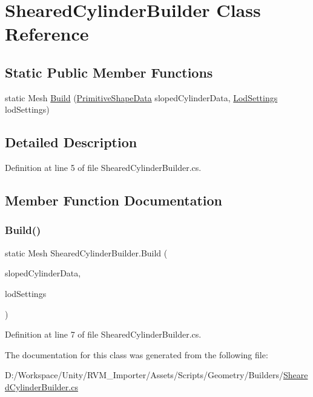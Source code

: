 \hypertarget{class_sheared_cylinder_builder}{}\section{Sheared\+Cylinder\+Builder Class Reference}
\label{class_sheared_cylinder_builder}
\subsection*{Static Public Member Functions}
\begin{DoxyCompactItemize}
\item 
static Mesh \mbox{\hyperlink{class_sheared_cylinder_builder_a018baf9cf913dbc297669d668c66264c}{Build}} (\mbox{\hyperlink{class_primitive_shape_data}{Primitive\+Shape\+Data}} sloped\+Cylinder\+Data, \mbox{\hyperlink{class_lod_settings}{Lod\+Settings}} lod\+Settings)
\end{DoxyCompactItemize}


\subsection{Detailed Description}


Definition at line 5 of file Sheared\+Cylinder\+Builder.\+cs.



\subsection{Member Function Documentation}
\mbox{\label{class_sheared_cylinder_builder_a018baf9cf913dbc297669d668c66264c}} 
\subsubsection{\texorpdfstring{Build()}{Build()}}
{\footnotesize\ttfamily static Mesh Sheared\+Cylinder\+Builder.\+Build (\begin{DoxyParamCaption}\item[{\mbox{\hyperlink{class_primitive_shape_data}{Primitive\+Shape\+Data}}}]{sloped\+Cylinder\+Data,  }\item[{\mbox{\hyperlink{class_lod_settings}{Lod\+Settings}}}]{lod\+Settings }\end{DoxyParamCaption})\hspace{0.3cm}{\ttfamily [static]}}



Definition at line 7 of file Sheared\+Cylinder\+Builder.\+cs.



The documentation for this class was generated from the following file\+:\begin{DoxyCompactItemize}
\item 
D\+:/\+Workspace/\+Unity/\+R\+V\+M\+\_\+\+Importer/\+Assets/\+Scripts/\+Geometry/\+Builders/\mbox{\hyperlink{_sheared_cylinder_builder_8cs}{Sheared\+Cylinder\+Builder.\+cs}}\end{DoxyCompactItemize}
